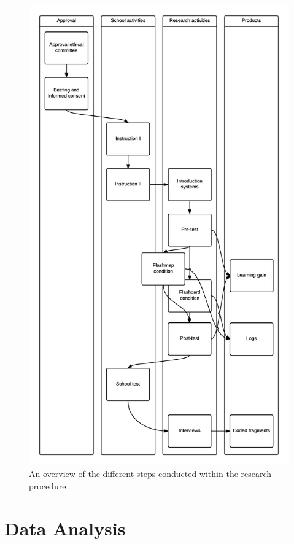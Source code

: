 \documentclass[11pt,twoside]{report} %
\begin{document}
\begin{figure}
    \centering
    \includegraphics[height=.85\textheight]{img/procedure}
    \caption{An overview of the different steps conducted within the research procedure}
    \label{fig:procedure}
\end{figure}

\section{Data Analysis}
\end{document}
